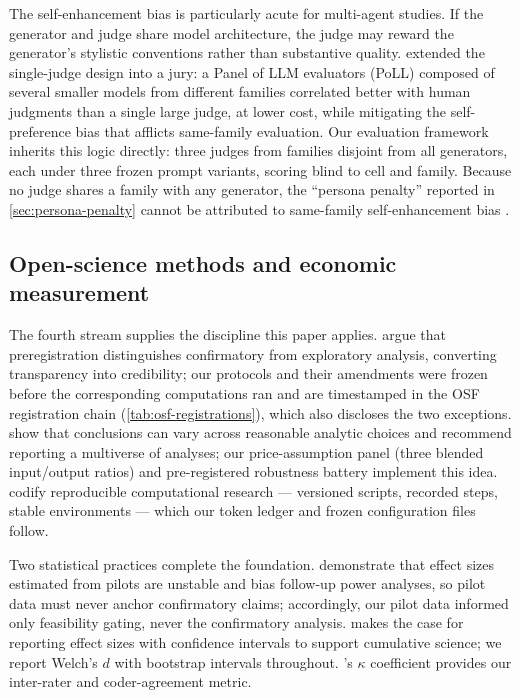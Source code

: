 \documentclass[12pt,a4paper]{article}
\begin{document}
The self-enhancement bias is particularly acute for multi-agent studies. If the
generator and judge share model architecture, the judge may reward the
generator's stylistic conventions rather than substantive quality.
\citet{VergaEtAl2024} extended the single-judge design into a jury: a Panel of
LLM evaluators (PoLL) composed of several smaller models from different
families correlated better with human judgments than a single large judge, at
lower cost, while mitigating the self-preference bias that afflicts same-family
evaluation. Our evaluation framework inherits this logic directly: three judges
from families disjoint from all generators, each under three frozen prompt
variants, scoring blind to cell and family. Because no judge shares a family with any generator, the ``persona penalty'' reported in \cref{sec:persona-penalty} cannot be attributed to same-family self-enhancement bias \citep{ZhengEtAl2023}.

\subsection{Open-science methods and economic measurement}
The fourth stream supplies the discipline this paper applies. \citet{NosekEtAl2018}
argue that preregistration distinguishes confirmatory from exploratory
analysis, converting transparency into credibility; our protocols and their
amendments were frozen before the corresponding computations ran and are
timestamped in the OSF registration chain (\cref{tab:osf-registrations}), which
also discloses the two exceptions.
\citet{SteegenEtAl2016} show that conclusions can vary across reasonable
analytic choices and recommend reporting a multiverse of analyses; our
price-assumption panel (three blended input/output ratios) and pre-registered
robustness battery implement this idea. \citet{SandveEtAl2013} codify
reproducible computational research --- versioned scripts, recorded steps,
stable environments --- which our token ledger and frozen configuration files
follow.

Two statistical practices complete the foundation. \citet{AlbersLakens2018}
demonstrate that effect sizes estimated from pilots are unstable and bias
follow-up power analyses, so pilot data must never anchor confirmatory claims;
accordingly, our pilot data informed only feasibility gating, never the
confirmatory analysis. \citet{Lakens2013} makes the case for reporting effect sizes with
confidence intervals to support cumulative science; we report Welch's $d$ with
bootstrap intervals throughout. \citet{Cohen1960}'s $\kappa$ coefficient
provides our inter-rater and coder-agreement metric.
\end{document}
